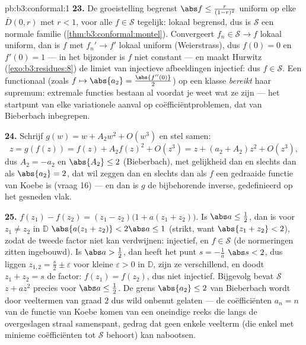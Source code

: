 \begin{solution}{pb:b3:conformal:1}
\textbf{23.} De groeistelling begrenst $\abs f \leq
\frac{r}{(1-r)^2}$ uniform op elke $\bar D(0, r)$ met $r < 1$,
voor alle $f \in \mathcal S$ tegelijk: lokaal begrensd, dus is
$\mathcal S$ een normale familie
(\cref{thm:b3:conformal:montel}). Convergeert $f_n \in \mathcal S
\to f$ lokaal uniform, dan is $f$  met $f_n' \to f'$
lokaal uniform (Weierstrass), dus $f(0) = 0$ en $f'(0) = 1$ ---
in het bijzonder is $f$ niet constant --- en maakt Hurwitz
(\cref{exo:b3:residues:8}) de limiet van injectieve afbeeldingen
injectief: dus $f \in \mathcal S$. Een  functionaal
(zoals $f \mapsto \abs{a_2} = \frac{\abs{f''(0)}}2$) op een
 klasse \emph{bereikt} haar supremum: extremale functies
bestaan al voordat je weet wat ze zijn --- het startpunt van elke
variationele aanval op coëfficiëntproblemen, dat van Bieberbach
inbegrepen.

\textbf{24.} Schrijf $g(w) = w + A_2w^2 + O(w^3)$ en stel samen:
\[
z = g(f(z)) = f(z) + A_2f(z)^2 + O(z^3)
= z + (a_2 + A_2)z^2 + O(z^3),
\]
dus $A_2 = -a_2$ en $\abs{A_2} \leq 2$ (Bieberbach), met
gelijkheid dan en slechts dan als $\abs{a_2} = 2$, dat wil zeggen
dan en slechts dan als $f$ een gedraaide functie van Koebe is
(vraag 16) --- en dan is $g$ de bijbehorende inverse,
gedefinieerd op het gesneden vlak.

\textbf{25.} $f(z_1) - f(z_2) = (z_1 - z_2)\bigl(1 + a(z_1 +
z_2)\bigr)$. Is $\abs a \leq \frac12$, dan is voor $z_1 \neq z_2$
in $\mathbb D$ $\abs{a(z_1 + z_2)} < 2\abs a \leq 1$ (strikt,
want $\abs{z_1 + z_2} < 2$), zodat de tweede factor niet kan
verdwijnen: injectief, en $f \in \mathcal S$ (de normeringen
zitten ingebouwd). Is $\abs a > \frac12$, dan heeft het punt $s =
-\frac1a$ $\abs s < 2$, dus liggen $z_{1,2} = \frac s2 \pm
\varepsilon$ voor kleine $\varepsilon > 0$ in $\mathbb D$, zijn
ze verschillend, en doodt $z_1 + z_2 = s$ de factor: $f(z_1) =
f(z_2)$, dus niet injectief. Bijgevolg bevat $\mathcal S$ $z +
az^2$ precies voor $\abs a \leq \frac12$. De grens $\abs{a_2}
\leq 2$ van Bieberbach wordt door veeltermen van graad $2$ dus
wild onbenut gelaten --- de coëfficiënten $a_n = n$ van de
functie van Koebe komen van een oneindige reeks die langs de
overgeslagen straal samenspant, gedrag dat geen enkele veelterm
(die enkel met minieme coëfficiënten tot $\mathcal S$ behoort)
kan nabootsen.
\end{solution}
